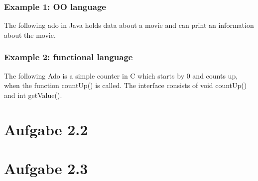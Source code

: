 \documentclass[a4paper,10pt]{scrartcl}[2003/01/01]
\begin{document}
	\subsubsection*{Example 1: OO language}
	The following ado in Java holds data about a movie and can print an information about the movie. 
	
	
	\subsubsection*{Example 2: functional language}
	The following Ado is a simple counter in C which starts by 0 and counts up, when the function countUp() is called. The interface consists of void countUp() and int getValue().
	
	
	
	\section*{Aufgabe 2.2}
	
	\section*{Aufgabe 2.3}
	
\end{document}
